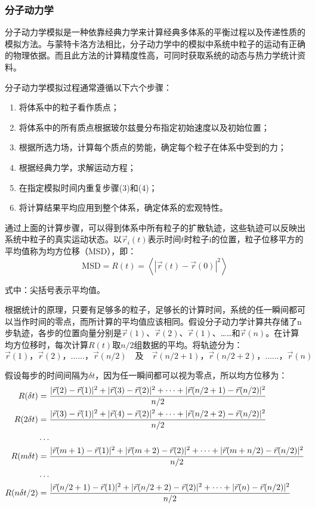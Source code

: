 \subsubsection{分子动力学}\label{分子动力学}
\par{分子动力学模拟是一种依靠经典力学来计算经典多体系的平衡过程以及传递性质的模拟方法\cite{分子模拟方法及模拟软件在高分子材料中的应用}。与蒙特卡洛方法相比，分子动力学中的模拟中系统中粒子的运动有正确的物理依据。而且此方法的计算精度性高，可同时获取系统的动态与热力学统计资料。}
\par{分子动力学模拟过程通常遵循以下六个步骤\cite{烷烃分子在MCM-41中吸附和扩散的分子模拟}：}
\begin{enumerate}
    \item 将体系中的粒子看作质点；
    \item 将体系中的所有质点根据玻尔兹曼分布指定初始速度以及初始位置；
    \item 根据所选力场，计算每个质点的势能，确定每个粒子在体系中受到的力；
    \item 根据经典力学，求解运动方程；
    \item 在指定模拟时间内重复步骤(3)和(4)；
    \item 将计算结果平均应用到整个体系，确定体系的宏观特性。
\end{enumerate}
\par{通过上面的计算步骤，可以得到体系中所有粒子的扩散轨迹，这些轨迹可以反映出系统中粒子的真实运动状态。以$\vec r_{i}(t)$表示时间$t$时粒子i的位置，粒子位移平方的平均值称为均方位移（MSD），即：}
\begin{equation}
    \mathrm{MSD}=R(t)=\left\langle|\vec{r}(t)-\vec{r}(0)|^{2}\right\rangle
\end{equation}
\par{式中：尖括号表示平均值。}
\par{根据统计的原理，只要有足够多的粒子，足够长的计算时间，系统的任一瞬间都可以当作时间的零点，而所计算的平均值应该相同。假设分子动力学计算共存储了n步轨迹，各步的位置向量分别是$\vec r(1)$、$\vec r(2)$、$\vec r(1)$、……和$\vec r(n)$。在计算均方位移时，每次计算$R(t)$取$n/2$组数据的平均。将轨迹分为：}
$$
\vec{r}(1)\mbox{，}\vec{r}(2)\mbox{，……，}\vec{r}(n / 2)\quad\mbox{及}\quad\vec{r}(n / 2+1)\mbox{，}\vec{r}(n / 2+2)\mbox{，……，}\vec{r}(n)
$$
\par{假设每步的时间间隔为$\delta t$，因为任一瞬间都可以视为零点，所以均方位移为：}
\begin{align}\label{equ:MSD}
    R(\delta t)&=\frac{|\vec{r}(2)-\vec{r}(1)|^{2}+|\vec{r}(3)-\vec{r}(2)|^{2}+\cdots+|\vec{r}(n / 2+1)-\vec{r}(n / 2)|^{2}}{n / 2}\notag\\
    R(2 \delta t)&=\frac{|\vec{r}(3)-\vec{r}(1)|^{2}+|\vec{r}(4)-\vec{r}(2)|^{2}+\cdots+|\vec{r}(n / 2+2)-\vec{r}(n / 2)|^{2}}{n / 2}\notag\\
    &\dots\notag\\
    R(m \delta t)&=\frac{|\vec{r}(m+1)-\vec{r}(1)|^{2}+|\vec{r}(m+2)-\vec{r}(2)|^{2}+\cdots+|\vec{r}(m+n / 2)-\vec{r}(n / 2)|^{2}}{n / 2}\notag\\
    &\dots\notag\\
    R(n \delta t / 2)&=\frac{|\vec{r}(n / 2+1)-\vec{r}(1)|^{2}+|\vec{r}(n / 2+2)-\vec{r}(2)|^{2}+\cdots+|\vec{r}(n)-\vec{r}(n / 2)|^{2}}{n / 2}
\end{align}
